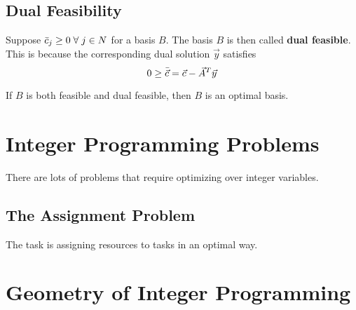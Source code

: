 \subsection{Dual Feasibility}
Suppose $\Bar{c}_j \geq 0 \;\forall\; j\in N$ for a basis $B$. The basis $B$ is then called \textbf{dual feasible}. This is because the corresponding dual solution $\Vec{y}$ satisfies \begin{equation}
    0\geq\Bar{\Vec{c}}=\Vec{c}-\Vec{A}^T\Vec{y}
\end{equation}

\begin{theorem}
If $B$ is both feasible and dual feasible, then $B$ is an optimal basis.
\end{theorem}



\section{Integer Programming Problems}
There are lots of problems that require optimizing over integer variables.


\subsection{The Assignment Problem}
The task is assigning resources to tasks in an optimal way.




\section{Geometry of Integer Programming}


